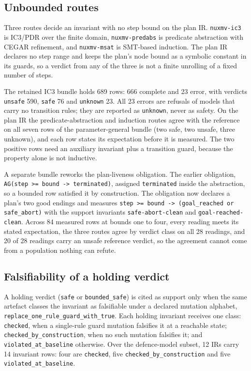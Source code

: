 \documentclass[11pt]{article}
\begin{document}
\subsection{Unbounded routes}

Three routes decide an invariant with no step bound on the plan IR.
\texttt{nuxmv-ic3} is IC3/PDR over the finite domain, \texttt{nuxmv-predabs}
is predicate abstraction with CEGAR refinement, and \texttt{nuxmv-msat} is
SMT-based induction. The plan IR declares no step range and keeps the plan's
node bound as a symbolic constant in its guards, so a verdict from any of the
three is not a finite unrolling of a fixed number of steps.

The retained IC3 bundle holds 689 rows: 666 complete and 23 error, with
verdicts \texttt{unsafe} 590, \texttt{safe} 76 and \texttt{unknown} 23. All
23 errors are refusals of models that carry no transition rules; they are
reported as \texttt{unknown}, never as safety. On the plan IR the
predicate-abstraction and induction routes agree with the reference on all
seven rows of the parameter-general bundle (two safe, two unsafe, three
unknown), and each row states its expectation before it is measured. The two
positive rows need an auxiliary invariant plus a transition guard, because
the property alone is not inductive.

A separate bundle reworks the plan-liveness obligation. The earlier
obligation, \texttt{AG(step >= bound -> terminated)}, assigned
\texttt{terminated} inside the abstraction, so a bounded row satisfied it by
construction. The obligation now declares a plan's two good endings and
measures \texttt{step >= bound -> (goal\_reached or safe\_abort)} with the
support invariants \texttt{safe-abort-clean} and \texttt{goal-reached-clean}.
Across 84 measured rows at bounds one to four, every reading meets its stated
expectation, the three routes agree by verdict class on all 28 readings, and
20 of 28 readings carry an unsafe reference verdict, so the agreement cannot
come from a population nothing can refute.

\subsection{Falsifiability of a holding verdict}

A holding verdict (\texttt{safe} or \texttt{bounded\_safe}) is cited as
support only when the same artefact classes the invariant as falsifiable under
a declared mutation alphabet, \texttt{replace\_one\_rule\_guard\_with\_true}.
Each holding invariant receives one class: \texttt{checked}, when a
single-rule guard mutation falsifies it at a reachable state;
\texttt{checked\_by\_construction}, when no such mutation falsifies it; and
\texttt{violated\_at\_baseline} otherwise. Over the defence-model subset, 12
IRs carry 14 invariant rows: four are \texttt{checked}, five
\texttt{checked\_by\_construction} and five \texttt{violated\_at\_baseline}.
\end{document}
